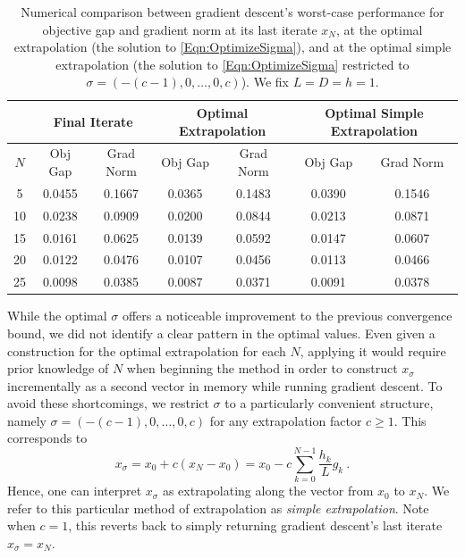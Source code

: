 \documentclass[11pt]{article}
\numberwithin{equation}{section}
\theoremstyle{definition}
\theoremstyle{definition}
\theoremstyle{definition}
\newcommand{\1}{\mathbf{1}}
\newcommand{\xSpecial}{x_\sigma}
\begin{document}
\begin{table}[t]
\centering\footnotesize
\begin{tabular}{| c | c c | c c | c c |} 
 \hline
 & \multicolumn{2}{|c|}{Final Iterate} & \multicolumn{2}{|c|}{Optimal Extrapolation} & \multicolumn{2}{|c|}{Optimal Simple Extrapolation}  \\ [0.5ex] 
 \hline
 $N$ & Obj Gap & Grad Norm & Obj Gap & Grad Norm & Obj Gap & Grad Norm \\
 \hline
 5  & 0.0455 & 0.1667 & 0.0365 & 0.1483 & 0.0390 & 0.1546 \\ 
 10 & 0.0238 & 0.0909 & 0.0200 & 0.0844 & 0.0213 & 0.0871 \\
 15 & 0.0161 & 0.0625 & 0.0139 & 0.0592 & 0.0147 & 0.0607 \\ 
 20 & 0.0122 & 0.0476 & 0.0107 & 0.0456 & 0.0113 & 0.0466 \\
 25 & 0.0098 & 0.0385 & 0.0087 & 0.0371 & 0.0091 & 0.0378 \\
 \hline
\end{tabular}
\caption{Numerical comparison between gradient descent's worst-case performance for objective gap and gradient norm at its last iterate $x_N$, at the optimal extrapolation (the solution to \eqref{Eqn:OptimizeSigma}), and at the optimal simple extrapolation (the solution to \eqref{Eqn:OptimizeSigma} restricted to $\sigma = (-(c-1),0,
\dots,0,c)$). We fix $L=D=h=1$.}\label{tab:extrapolation-performance}
\end{table}

While the optimal $\sigma$ offers a noticeable improvement to the previous convergence bound, we did not identify a clear pattern in the optimal values. Even given a construction for the optimal extrapolation for each $N$, applying it would require prior knowledge of $N$ when beginning the method in order to construct $\xSpecial$ incrementally as a second vector in memory while running gradient descent. To avoid these shortcomings, we restrict $\sigma$ to a particularly convenient structure, namely $\sigma = (-(c-1),0,\dots,0,c)$ for any extrapolation factor $c \geq 1$. This corresponds to
\begin{equation}\label{Eqn:xSpecialSimple}
    \xSpecial = x_0 + c(x_N-x_0) = x_0 - c\sum_{k=0}^{N-1}\frac{h_k}{L} g_k \ .
\end{equation}
Hence, one can interpret $\xSpecial$ as extrapolating along the vector from $x_0$ to $x_N$. We refer to this particular method of extrapolation as \textit{simple extrapolation}. Note when $c=1$, this reverts back to simply returning gradient descent's last iterate $\xSpecial = x_N$. 
\end{document}
